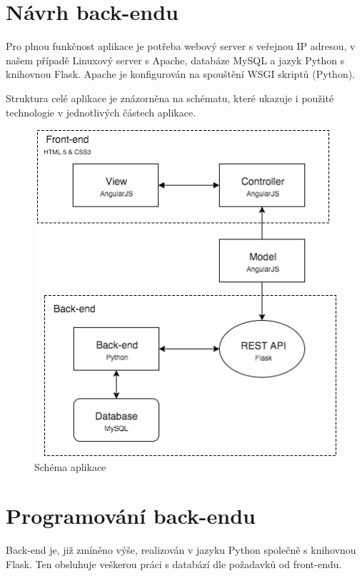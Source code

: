 \documentclass[11pt,a4paper]{article}
\begin{document}
\section*{Návrh back-endu}
Pro plnou funkčnost aplikace je potřeba webový server s veřejnou IP adresou, v našem případě Linuxový server s Apache, databáze MySQL a jazyk Python s knihovnou Flask. Apache je konfigurován na spouštění WSGI skriptů (Python). 

Struktura celé aplikace je znázorněna na schématu, které ukazuje i použité technologie v jednotlivých částech aplikace.
\newline
\newline
\begin{figure}[ht]
\center
\includegraphics[scale=0.5]{schema.png}
\caption{Schéma aplikace}
\end{figure}


\section*{Programování back-endu}
Back-end je, již zmíněno výše, realizován v jazyku Python společně s knihovnou Flask. Ten obsluhuje veškerou práci s databází dle požadavků od front-endu.
\end{document}
